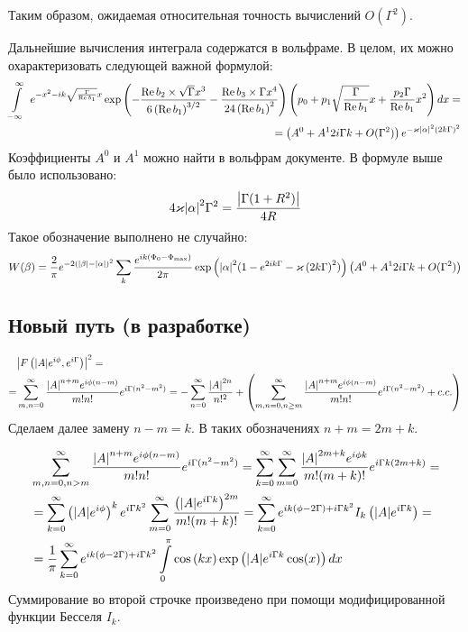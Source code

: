 \documentclass[a4paper, 12pt]{article}
\DeclareMathOperator*{\Real}{Re}
\newenvironment{eqw}{\begin{equation} \begin{aligned}}   
    {\end{aligned}    \end{equation}}
\begin{document}
Таким образом, ожидаемая относительная точность вычислений $O(\Gamma^{2})$.

Дальнейшие вычисления интеграла содержатся в вольфраме. В целом, их можно охарактеризовать следующей важной формулой:
\begin{eqw}
    \int\limits_{-\infty}^{\infty}\
    e^{-x^2 - ik\sqrt{\frac{\Gamma}{\Real b_1}}x} \exp\left(-\frac{\Real b_2 \times\sqrt{\Gamma} x^3}{6\left(\Real b_1\right)^{3/2}} - \frac{\Real b_3\times \Gamma x^4}{24\left(\Real b_1\right)^{2}} \right)
    \left(p_0 + p_1\sqrt{\frac{\Gamma}{\Real b_1}}x +\frac{p_2\Gamma}{\Real b_1}x^2\right) dx = \\
    = \left(A^0 + A^1 2i\Gamma k + O(\Gamma^2)\right) e^{-\varkappa \abs{\alpha}^2 \left(2k{\Gamma}\right)^2}
\end{eqw}
Коэффициенты $A^0$ и $A^1$ можно найти в вольфрам документе. В формуле выше было использовано:
\begin{eqw}
    4\varkappa \abs{\alpha}^2\Gamma^2 = \frac{\abs{\Gamma (1+R^2)}}{4R}
\end{eqw}
Такое обозначение выполнено не случайно:
\begin{eqw}
     W(\beta) = \frac{2}{\pi}e^{-2\left(\abs{\beta} - \abs{\alpha}\right)^2}
     \sum\limits_k \frac{e^{ik\left(\Phi_0-\Phi_{\max}\right)}}{2\pi}
     \exp\left(\abs{\alpha}^2 (1-e^{2ik\Gamma}-\varkappa \left(2k{\Gamma}\right)^2)\right) \left(A^0 + A^1 2i\Gamma k + O(\Gamma^2)\right)
\end{eqw}
\subsection*{Новый путь (в разработке)}
\begin{eqw}
     &\abs{F\left(\abs{A}e^{i\phi}, e^{i\Gamma}\right)}^2 =\\
     =&\sum_{m, n = 0}^{\infty} \frac{\abs{A}^{n+m}e^{i\phi(n-m)}}{m!n!} e^{i\Gamma(n^2 - m^2)} = -\sum_{n=0}^{\infty} \frac{\abs{A}^{2n}}{n!^2} + \left(\sum_{m, n = 0, n\ge m}^{\infty}\frac{\abs{A}^{n+m}e^{i\phi(n-m)}}{m!n!} e^{i\Gamma(n^2 - m^2)} + c.c.\right)
\end{eqw}
Сделаем далее замену $n-m=k$. В таких обозначениях $n+m = 2m+k$.

\begin{eqw}
    &\sum_{m, n = 0, n>m}^{\infty}\frac{\abs{A}^{n+m}e^{i\phi(n-m)}}{m!n!}e^{i\Gamma(n^2 - m^2)} = \sum_{k=0}^{\infty}\sum_{m=0}^{\infty}\frac{\abs{A}^{2m+k}e^{i\phi k}}{m!(m+k)!}e^{i\Gamma k(2m+k)} = \\
    &=\sum_{k=0}^{\infty}\left(\abs{A} e^{i\phi}\right)^{k}e^{i\Gamma k^2}\sum_{m=0}^{\infty}\frac{\left(\abs{A}e^{i\Gamma k}\right)^{2m}}{m!(m+k)!} = \sum_{k=0}^{\infty}e^{ik(\phi - 2\Gamma)+i\Gamma k^2}I_{k}\left(\abs{A}e^{i\Gamma k}\right)=\\
    &=\frac{1}{\pi}\sum_{k=0}^{\infty}e^{ik(\phi - 2\Gamma)+i\Gamma k^2}\int\limits_0^{\pi}\cos\left(k x\right)\exp\left(\abs{A}e^{i\Gamma k}\cos(x)\right)dx
\end{eqw}
Суммирование во второй строчке произведено при помощи модифицированной функции Бесселя $I_k$.
\end{document}
